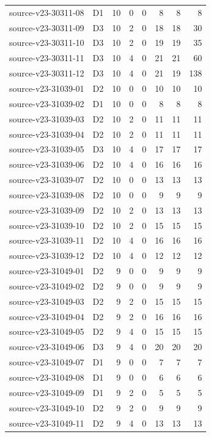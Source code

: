 \begin{longtable}{p{}lrrrrrr}
source-v23-30311-08 & D1 & 10 & 0 & 0 & 8 & 8 & 8\\
source-v23-30311-09 & D3 & 10 & 2 & 0 & 18 & 18 & 30\\
source-v23-30311-10 & D3 & 10 & 2 & 0 & 19 & 19 & 35\\
source-v23-30311-11 & D3 & 10 & 4 & 0 & 21 & 21 & 60\\
source-v23-30311-12 & D3 & 10 & 4 & 0 & 21 & 19 & 138\\
source-v23-31039-01 & D2 & 10 & 0 & 0 & 10 & 10 & 10\\
source-v23-31039-02 & D1 & 10 & 0 & 0 & 8 & 8 & 8\\
source-v23-31039-03 & D2 & 10 & 2 & 0 & 11 & 11 & 11\\
source-v23-31039-04 & D2 & 10 & 2 & 0 & 11 & 11 & 11\\
source-v23-31039-05 & D3 & 10 & 4 & 0 & 17 & 17 & 17\\
source-v23-31039-06 & D2 & 10 & 4 & 0 & 16 & 16 & 16\\
source-v23-31039-07 & D2 & 10 & 0 & 0 & 13 & 13 & 13\\
source-v23-31039-08 & D2 & 10 & 0 & 0 & 9 & 9 & 9\\
source-v23-31039-09 & D2 & 10 & 2 & 0 & 13 & 13 & 13\\
source-v23-31039-10 & D2 & 10 & 2 & 0 & 15 & 15 & 15\\
source-v23-31039-11 & D2 & 10 & 4 & 0 & 16 & 16 & 16\\
source-v23-31039-12 & D2 & 10 & 4 & 0 & 12 & 12 & 12\\
source-v23-31049-01 & D2 & 9 & 0 & 0 & 9 & 9 & 9\\
source-v23-31049-02 & D2 & 9 & 0 & 0 & 9 & 9 & 9\\
source-v23-31049-03 & D2 & 9 & 2 & 0 & 15 & 15 & 15\\
source-v23-31049-04 & D2 & 9 & 2 & 0 & 16 & 16 & 16\\
source-v23-31049-05 & D2 & 9 & 4 & 0 & 15 & 15 & 15\\
source-v23-31049-06 & D3 & 9 & 4 & 0 & 20 & 20 & 20\\
source-v23-31049-07 & D1 & 9 & 0 & 0 & 7 & 7 & 7\\
source-v23-31049-08 & D1 & 9 & 0 & 0 & 6 & 6 & 6\\
source-v23-31049-09 & D1 & 9 & 2 & 0 & 5 & 5 & 5\\
source-v23-31049-10 & D2 & 9 & 2 & 0 & 9 & 9 & 9\\
source-v23-31049-11 & D2 & 9 & 4 & 0 & 13 & 13 & 13\\

\end{longtable}
